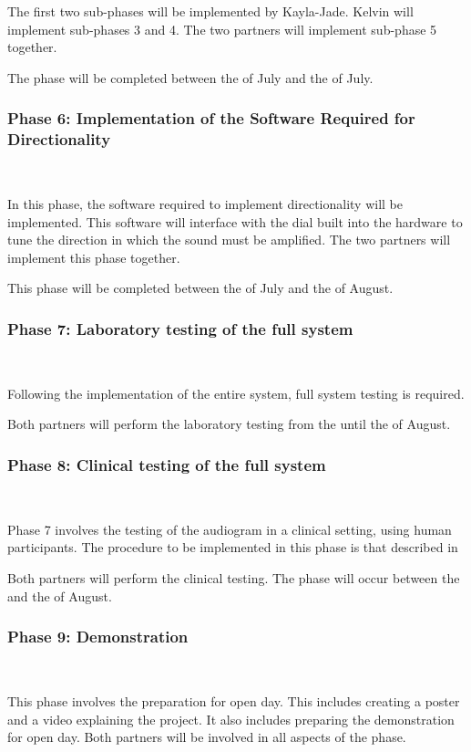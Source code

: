 \documentclass[10pt,twocolumn]{witseiepaper}
\begin{document}
The first two sub-phases will be implemented by Kayla-Jade. Kelvin will implement sub-phases 3 and 4. The two partners will implement sub-phase 5 together.

The phase will be completed between the  of July and the  of July.


\subsubsection*{Phase 6: Implementation of the Software Required for Directionality} $    $

In this phase, the software required to implement directionality will be implemented. This software will interface with the dial built into the hardware to tune the direction in which the sound must be amplified. The two partners will implement this phase together. 

This phase will be completed between the  of July and the  of August.

\subsubsection*{Phase 7: Laboratory testing of the full system} $    $

Following the implementation of the entire system, full system testing is required. 

Both partners will perform the laboratory testing from the  until the  of August.

\subsubsection*{Phase 8: Clinical testing of the full system} $    $

Phase 7 involves the testing of the audiogram in a clinical setting, using human participants. The procedure to be implemented in this phase is that described in 

Both partners will perform the clinical testing. The phase will occur between the  and the  of August.

\subsubsection*{Phase 9: Demonstration} $    $

This phase involves the preparation for open day. This includes creating a poster and a video explaining the project. It also includes preparing the demonstration for open day. Both partners will be involved in all aspects of the phase.
\end{document}

